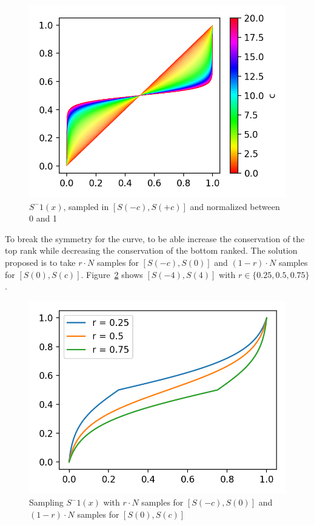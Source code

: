 \begin{figure}
  \centering
  \includegraphics[width=\linewidth]{img/s_curve_c.png}
  \caption{$S^-1(x)$, sampled in $\left[S(-c), S(+c)\right]$ and normalized between 0 and 1}
  \label{fig:s_curve_c}
\end{figure}

To break the symmetry for the curve, to be able increase the conservation of the top rank while decreasing the conservation of the bottom ranked. The solution proposed is to take $r \cdot N$ samples for $\left[S(-c), S(0)\right]$ and $(1-r) \cdot N$ samples for $\left[S(0), S(c)\right]$. Figure~\ref{fig:s_curve_r} shows $\left[S(-4), S(4)\right]$ with $r \in \{0.25, 0.5, 0.75\}$.

\begin{figure}
  \includegraphics[width=\linewidth]{img/s_curve_r.png}
  \caption{Sampling $S^-1(x)$ with $r \cdot N$ samples for $\left[S(-c), S(0)\right]$ and $(1-r) \cdot N$ samples for $\left[S(0), S(c)\right]$}
  \label{fig:s_curve_r}
\end{figure}

